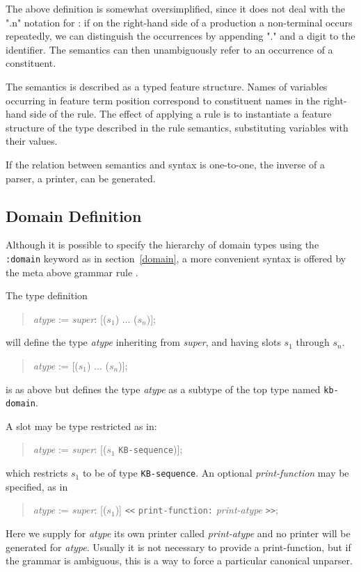 The above definition is somewhat oversimplified, since it does not
deal with the ".n" notation for : if on the
right-hand side of a production a non-terminal occurs repeatedly, we
can distinguish the occurrences by appending "." and a digit to the
identifier.  The semantics can then unambiguously refer to an
occurrence of a constituent.

The semantics is described as a typed feature structure.  Names of
variables occurring in feature term position correspond to constituent
names in the right-hand side of the rule.  The effect of applying a
rule is to instantiate a feature structure of the type described in
the rule semantics, substituting variables with their values.

If the relation between semantics and syntax is one-to-one, the
inverse of a parser, a printer, can be generated.

\subsection {Domain Definition} 

Although it is possible to specify the hierarchy of domain types using
the {\tt :domain} keyword as in section~\ref{domain}, a more
convenient syntax is offered by the meta above grammar rule
.

The type definition
\begin{quote}
{\it atype} := {\it super}: [({\it $s_1$}) ... ({\it $s_n$})];
\end{quote}
will define the type {\it atype} inheriting from {\it super}, and
having slots {\it $s_1$} through {\it $s_n$}.

\begin{quote}
{\it atype} := [({\it $s_1$}) ... ({\it $s_n$})];
\end{quote}
is as above but defines the type {\it atype} as a subtype of the
top type named {\tt kb-domain}.

A slot may be type restricted as in:
\begin{quote}
{\it atype} := {\it super}: [({\it $s_1$} {\tt KB-sequence})];
\end{quote}
which restricts {\it $s_1$} to be of type {\tt KB-sequence}.  An
optional {\it print-function} may be specified, as in

\begin{quote}
{\it atype} := {\it super}: [({\it $s_1$})]
 \verb+<<+ {\tt print-function:} {\it print-atype} \verb+>>+;
\end{quote}
Here we supply for {\it atype} its own printer called {\it
print-atype} and no printer will be generated for {\it atype}.
Usually it is not necessary to provide a print-function, but if the
grammar is ambiguous, this is a way to force a particular canonical
unparser.

